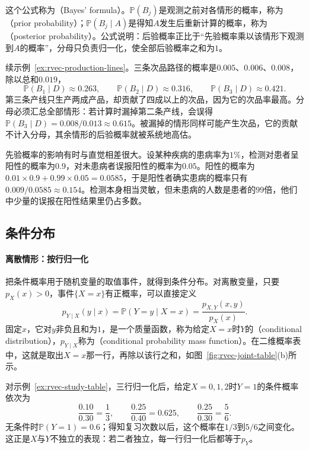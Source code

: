 这个公式称为（Bayes' formula）。$\mathbb P(B_j)$是观测之前对各情形的概率，称为（prior probability）；$\mathbb P(B_j\mid A)$是得知$A$发生后重新计算的概率，称为（posterior probability）。公式说明：后验概率正比于“先验概率乘以该情形下观测到$A$的概率”，分母只负责归一化，使全部后验概率之和为$1$。

\begin{example}[次品来自哪条产线]
\label{ex:rvec-production-bayes}
续示例~\ref{ex:rvec-production-lines}。三条次品路径的概率是$0.005$、$0.006$、$0.008$，除以总和$0.019$，
\[
 \mathbb P(B_1\mid D)\approx0.263,\qquad \mathbb P(B_2\mid D)\approx0.316,\qquad \mathbb P(B_3\mid D)\approx0.421 .
\]
第三条产线只生产两成产品，却贡献了四成以上的次品，因为它的次品率最高。分母必须汇总全部情形：若计算时漏掉第二条产线，会误得$\mathbb P(B_3\mid D)=0.008/0.013\approx0.615$。被漏掉的情形同样可能产生次品，它的贡献不计入分母，其余情形的后验概率就被系统地高估。
\end{example}

先验概率的影响有时与直觉相差很大。设某种疾病的患病率为$1\%$，检测对患者呈阳性的概率为$0.9$，对未患病者误报阳性的概率为$0.05$。阳性的概率为$0.01\times0.9+0.99\times0.05=0.0585$，于是阳性者确实患病的概率只有$0.009/0.0585\approx0.154$。检测本身相当灵敏，但未患病的人数是患者的$99$倍，他们中少量的误报在阳性结果里仍占多数。

\subsection{条件分布}

\paragraph{离散情形：按行归一化}
把条件概率用于随机变量的取值事件，就得到条件分布。对离散变量，只要$p_X(x)>0$，事件$\{X=x\}$有正概率，可以直接定义
\[
 p_{Y\mid X}(y\mid x)=\mathbb P(Y=y\mid X=x)=\frac{p_{X,Y}(x,y)}{p_X(x)} .
\]
固定$x$，它对$y$非负且和为$1$，是一个质量函数，称为给定$X=x$时$Y$的（conditional distribution），$p_{Y\mid X}$称为（conditional probability mass function）。在二维概率表中，这就是取出$X=x$那一行，再除以该行之和，如图~\ref{fig:rvec-joint-table}(b)所示。

对示例~\ref{ex:rvec-study-table}，三行归一化后，给定$X=0,1,2$时$Y=1$的条件概率依次为
\[
 \frac{0.10}{0.30}=\frac13,\qquad \frac{0.25}{0.40}=0.625,\qquad \frac{0.25}{0.30}=\frac56 .
\]
无条件时$\mathbb P(Y=1)=0.6$；得知复习次数以后，这个概率在$1/3$到$5/6$之间变化。这正是$X$与$Y$不独立的表现：若二者独立，每一行归一化后都等于$p_Y$。

